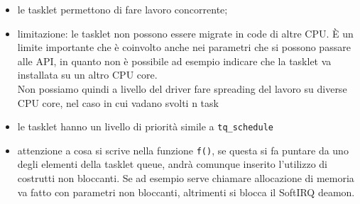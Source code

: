 \documentclass[12pt, oneside]{extbook}
\begin{document}
\begin{itemize}
\item le tasklet permettono di fare lavoro concorrente;
\item limitazione: le tasklet non possono essere migrate in code di altre CPU. È un limite importante che è coinvolto anche nei parametri che si possono passare alle API, in quanto non è possibile ad esempio indicare che la tasklet va installata su un altro CPU core.\\Non possiamo quindi a livello del driver fare spreading del lavoro su diverse CPU core, nel caso in cui vadano svolti n task
\item le tasklet hanno un livello di priorità simile a \texttt{tq\_schedule}
\item attenzione a cosa si scrive nella funzione \texttt{f()}, se questa si fa puntare da uno degli elementi della tasklet queue, andrà comunque inserito l'utilizzo di costrutti non bloccanti. Se ad esempio serve chiamare allocazione di memoria va fatto con parametri non bloccanti, altrimenti si blocca il SoftIRQ deamon.
\end{itemize}
\end{document}
